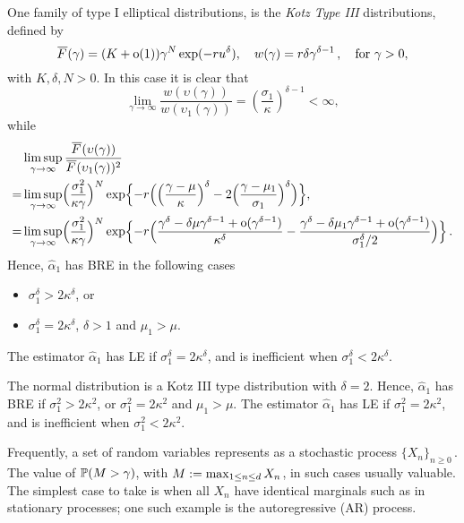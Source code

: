 \begin{example}
 One family of type I elliptical distributions, is the \emph{Kotz Type III} distributions, defined by
 \[
  \Ftail(\gamma)=(K+\oh(1))\gamma^N\exp(-ru^\delta),\quad w(\gamma)=r\delta \gamma^{\delta-1}\,, \quad \text{for } \gamma>0,
 \]
 with $K,\delta,N>0$.  In this case it is clear that
 \[
  \lim_{\gamma\to \infty}\frac{w(\upsilon(\gamma))}{w(\upsilon_1(\gamma))}=\left(\frac{\sigma_1}{\kappa}\right)^{\delta-1}<\infty,
 \]
 while
  \begin{align*}
  &\limsup_{\gamma\to \infty}\frac{\Ftail(\upsilon(\gamma))}{\Ftail(\upsilon_1(\gamma))^{2}} \\
   =&\limsup_{\gamma\to \infty}\Bigl(\frac{\sigma_1^2}{\kappa \gamma}\Bigr)^{N}
    \exp\Bigl\{ {-}r\Bigl(\Bigl(\frac{\gamma-\mu}{\kappa}\Bigr)^\delta-2\Bigl(\frac{\gamma-\mu_1}{\sigma_1}\Bigr)^\delta\Bigr)\Bigr\},\\
   =&\limsup_{\gamma\to \infty}\Bigl(\frac{\sigma_1^2}{\kappa \gamma}\Bigr)^{N}
    \exp\Bigl\{ {-}r\Bigl(\frac{\gamma^\delta-\delta\mu \gamma^{\delta-1}+\oh(\gamma^{\delta-1})}{\kappa^\delta}
    -\frac{\gamma^\delta-\delta\mu_1 \gamma^{\delta-1}+\oh(\gamma^{\delta-1})}{\sigma_1^\delta/2}\Bigr)\Bigr\} \,.
 \end{align*}
 Hence, $\hat{\alpha}_1$ has BRE in the following cases
 \begin{itemize}
  \item $\sigma_1^\delta>2\kappa^\delta$, or
  \item $\sigma_1^\delta=2\kappa^\delta$, $\delta>1$ and $\mu_1>\mu$.
 \end{itemize}
 The estimator $\hat{\alpha}_1$ has LE if $\sigma_1^\delta=2\kappa^\delta$, and is inefficient when $\sigma_1^\delta<2\kappa^\delta$.
\end{example}

\begin{example} \label{ex:normal}
The normal distribution is a Kotz III type distribution with $\delta=2$.
Hence, $\hat{\alpha}_1$ has BRE if $\sigma_1^2>2\kappa^2$, or $\sigma_1^2=2\kappa^2$ and $\mu_1>\mu$.
The estimator $\hat{\alpha}_1$ has LE if $\sigma_1^2=2\kappa^2$, and is inefficient when $\sigma_1^2<2\kappa^2$.
\end{example}

Frequently, a set of random variables represents as a stochastic process $\{X_n\}_{n\ge0}\,$. The value of $\operatorname{{\mathbb P}}(M > \gamma)$, with $M := \max_{1 \le n \le d} X_n$, in such cases usually valuable. The simplest case to take is when all $X_n$ have identical marginals such as in stationary processes; one such example is the autoregressive (AR) process.

